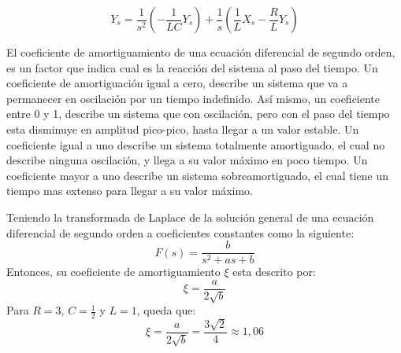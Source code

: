 \documentclass[12pt,a4paper]{report}
\begin{document}
\begin{enumerate}[label=\alph*)]
\begin{figure}[h]
        \begin{equation*}
          Y_s = \frac{1}{s^2}\left(-\frac{1}{LC} Y_s\right) + \frac{1}{s}\left(\frac{1}{L} X_s - \frac{R}{L} Y_s\right)
        \end{equation*}
      \end{figure}


      El coeficiente de amortiguamiento de una ecuación diferencial de segundo orden, es un factor que indica cual es la
      reacción del sistema al paso del tiempo. Un coeficiente de amortiguación igual a cero, describe un sistema
      que va a permanecer en oscilación por un tiempo indefinido. Así mismo, un coeficiente entre 0 y
      1, describe un sistema que con oscilación, pero con el paso del tiempo esta disminuye en amplitud pico-pico,
      hasta llegar a un valor estable. Un coeficiente igual a uno describe un sistema totalmente amortiguado, el cual no
      describe ninguna oscilación, y llega a su valor máximo en poco tiempo. Un coeficiente mayor a uno describe un sistema
      sobreamortiguado, el cual tiene un tiempo mas extenso para llegar a su valor máximo.

      Teniendo la transformada de Laplace de la solución general de una ecuación diferencial de segundo orden a
      coeficientes constantes como la siguiente:
      \begin{equation*}
        F(s) = \frac{b}{s^2+as+b}
      \end{equation*}
      Entonces, su coeficiente de amortiguamiento $\xi$ esta descrito por:
      \begin{equation*}
        \xi = \frac{a}{2\sqrt{b}}
      \end{equation*}
      Para $R = 3$, $C = \frac{1}{2}$ y $L = 1$, queda que:
      \begin{equation*}
        \xi = \frac{a}{2\sqrt{b}} = \frac{3\sqrt{2}}{4} \approx 1,\!06
      \end{equation*}


\end{enumerate}
\end{document}
